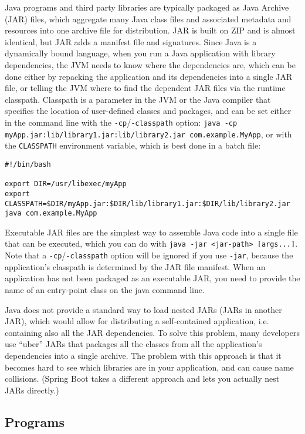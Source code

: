\documentclass[8pt, table, xcdraw]{article}%
\begin{document}
Java programs and third party libraries are typically packaged as Java Archive (JAR) files, which aggregate many Java class files and associated metadata and resources into one archive file for distribution. JAR is built on ZIP and is almost identical, but JAR adds a manifest file and signatures. Since Java is a dynamically bound language, when you run a Java application with library dependencies, the JVM needs to know where the dependencies are, which can be done either by repacking the application and its dependencies into a single JAR file, or telling the JVM where to find the dependent JAR files via the runtime classpath. Classpath is a parameter in the JVM or the Java compiler that specifies the location of user-defined classes and packages, and can be set either in the command line with the \lstinline{-cp}/\lstinline{-classpath} option: \lstinline{java -cp myApp.jar:lib/library1.jar:lib/library2.jar com.example.MyApp}, or with the \lstinline{CLASSPATH} environment variable, which is best done in a batch file:

\begin{lstlisting}
#!/bin/bash

export DIR=/usr/libexec/myApp
export CLASSPATH=$DIR/myApp.jar:$DIR/lib/library1.jar:$DIR/lib/library2.jar
java com.example.MyApp
\end{lstlisting}

Executable JAR files are the simplest way to assemble Java code into a single file that can be executed, which you can do with \lstinline{java -jar <jar-path> [args...]}. Note that a \lstinline{-cp}/\lstinline{-classpath} option will be ignored if you use \lstinline{-jar}, because the application's classpath is determined by the JAR file manifest. When an application has not been packaged as an executable JAR, you need to provide the name of an entry-point class on the java command line.

Java does not provide a standard way to load nested JARs (JARs in another JAR), which would allow for distributing a self-contained application, i.e. containing also all the JAR dependencies. To solve this problem, many developers use “uber” JARs that packages all the classes from all the application’s dependencies into a single archive. The problem with this approach is that it becomes hard to see which libraries are in your application, and can cause name collisions. (Spring Boot takes a different approach and lets you actually nest JARs directly.)

\subsection{Programs}
\end{document}
